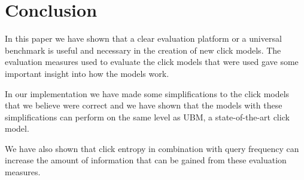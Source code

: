 \section{Conclusion}
\label{sec:conclusion}

In this paper we have shown that a clear evaluation platform or a universal benchmark is useful and necessary in the creation of new click models. The evaluation measures used to evaluate the click models that were used gave some important insight into how the models work. 

In our implementation we have made some simplifications to the click models that we believe were correct and we have shown that the models with these simplifications can perform on the same level as UBM, a state-of-the-art click model.

We have also shown that click entropy in combination with query frequency can increase the amount of information that can be gained from these evaluation measures.


